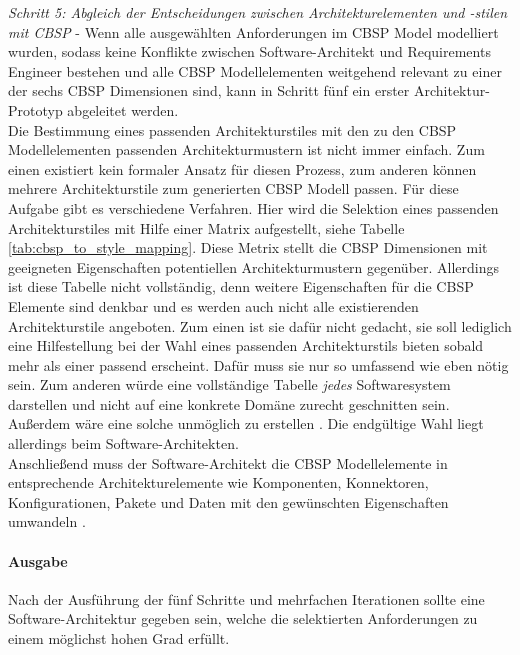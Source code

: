 \emph{Schritt 5: Abgleich der Entscheidungen zwischen Architekturelementen und -stilen mit CBSP} - 
Wenn alle ausgew\"ahlten Anforderungen im CBSP Model modelliert wurden, sodass keine Konflikte zwischen Software-Architekt und Requirements Engineer bestehen und alle CBSP Modellelementen weitgehend relevant zu einer der sechs CBSP Dimensionen sind, kann in Schritt f\"unf ein erster Architektur-Prototyp abgeleitet werden. \\
Die Bestimmung eines passenden Architekturstiles mit den zu den CBSP Modellelementen passenden Architekturmustern ist nicht immer einfach. Zum einen existiert kein formaler Ansatz f\"ur diesen Prozess, zum anderen k\"onnen mehrere Architekturstile zum generierten CBSP Modell passen. F\"ur diese Aufgabe gibt es verschiedene Verfahren. Hier wird die Selektion eines passenden Architekturstiles mit Hilfe einer Matrix aufgestellt, siehe Tabelle \ref{tab:cbsp_to_style_mapping}. Diese Metrix stellt die CBSP Dimensionen mit geeigneten Eigenschaften potentiellen Architekturmustern gegen\"uber. Allerdings ist diese Tabelle nicht vollst\"andig, denn weitere Eigenschaften f\"ur die CBSP Elemente sind denkbar und es werden auch nicht alle existierenden Architekturstile angeboten. Zum einen ist sie daf\"ur nicht gedacht, sie soll lediglich eine Hilfestellung bei der Wahl eines passenden Architekturstils bieten sobald mehr als einer passend erscheint. Daf\"ur muss sie nur so umfassend wie eben n\"otig sein. Zum anderen w\"urde eine vollst\"andige Tabelle \textit{jedes} Softwaresystem darstellen und nicht auf eine konkrete Dom\"ane zurecht geschnitten sein. Au\ss{}erdem w\"are eine solche unm\"oglich zu erstellen \cite{Gru01}. Die endg\"ultige Wahl liegt allerdings beim Software-Architekten. \\

Anschlie\ss{}end muss der Software-Architekt die CBSP Modellelemente in entsprechende Architekturelemente wie Komponenten, Konnektoren, Konfigurationen, Pakete und Daten mit den gew\"unschten Eigenschaften umwandeln \cite{Gru01}. \\

\paragraph{Ausgabe}

Nach der Ausf\"uhrung der f\"unf Schritte und mehrfachen Iterationen sollte eine Software-Architektur gegeben sein, welche die selektierten Anforderungen zu einem m\"oglichst hohen Grad erf\"ullt.

